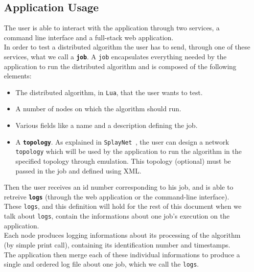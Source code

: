 \documentclass{eplmastersthesis}
\begin{document}
      \subsection{Application Usage}

        The user is able to interact with the application through two
        services, a command line interface and a full-stack web application.\\
        In order to test a distributed algorithm the user has to send, through
        one of these services, what we call a \textbf{\texttt{job}}. A
        \texttt{job} encapsulates everything needed by the application
        to run the distributed algorithm and is composed of the following
        elements:

        \begin{itemize}
          \item The distributed algorithm, in \texttt{Lua}, that the user wants to test.
          \item A number of nodes on which the algorithm should run.
          \item Various fields like a name and a description defining the job.
          \item A \textbf{\texttt{topology}}. As explained in
          \texttt{SplayNet}~\cite{SplayNet}, the user can design a network
          \texttt{topology} which will be used by the application
          to run the algorithm in the specified topology through emulation.
          This topology (optional) must be passed in the job and defined
          using XML.
        \end{itemize}

        Then the user receives an id number corresponding to his job, and
        is able to retreive \textbf{\texttt{logs}} (through the web application
        or the command-line interface).\\
        These \texttt{logs}, and this
        definition will hold for the rest of this document when we talk about
        \texttt{logs}, contain the informations about one job's
        execution on the application.\\
        Each node produces logging informations about its processing of the
        algorithm (by simple print call), containing its identification number and timestamps.\\ %
        The application then merge each of these individual informations
        to produce a single and ordered log file about one job, which we %
        call the \texttt{logs}.
\end{document}
